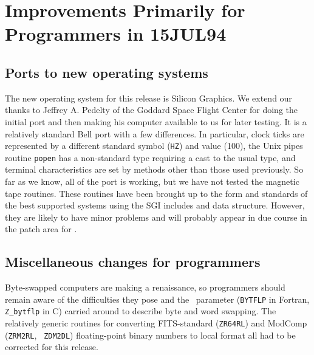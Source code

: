 \section{Improvements Primarily for Programmers in 15JUL94}

\subsection{Ports to new operating systems}

     The new operating system for this release is Silicon Graphics.
We extend our thanks to Jeffrey A. Pedelty of the Goddard Space Flight
Center for doing the initial port and then making his computer
available to us for later testing.  It is a relatively standard Bell
port with a few differences.  In particular, clock ticks are
represented by a different standard symbol ({\tt HZ}) and value (100),
the Unix pipes routine {\tt popen} has a non-standard type requiring a
cast to the usual type, and terminal characteristics are set by
methods other than those used previously.  So far as we know, all of
the port is working, but we have not tested the magnetic tape
routines.  These routines have been brought up to the form and
standards of the best supported systems using the SGI includes and
data structure.  However, they are likely to have minor problems and
will probably appear in due course in the patch area for
\hbox{\RELEASENAME}.

\subsection{Miscellaneous changes for programmers}

Byte-swapped computers are making a renaissance, so programmers should
remain aware of the difficulties they pose and the \AIPS\ parameter
({\tt BYTFLP} in Fortran, {\tt Z\_bytflp} in C) carried around to
describe byte and word swapping.  The relatively generic routines for
converting FITS-standard ({\tt ZR64RL}) and ModComp ({\tt ZRM2RL}, {\tt
ZDM2DL}) floating-point binary numbers to local format all had to be
corrected for this release.

